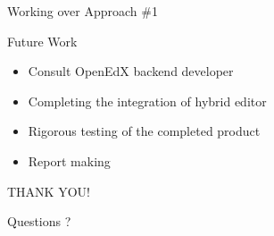 \documentclass{beamer}
\begin{document}
	\begin{frame}{Working over Approach \#1}
		\begin{block}{Future Work}
			\begin{itemize}
				\item Consult OpenEdX backend developer
				\item Completing the integration of hybrid editor
				\item Rigorous testing of the completed product
				\item Report making
			\end{itemize}
		\end{block}
	\end{frame}
	
	\begin{frame}
		THANK YOU!
	\end{frame}
	
	\begin{frame}
		Questions ?
	\end{frame}
\end{document}
